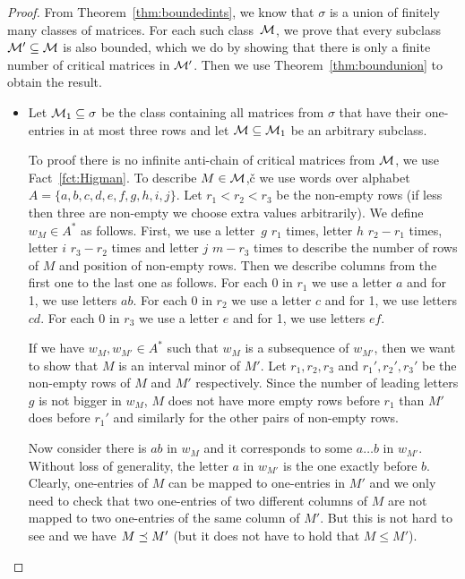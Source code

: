 \begin{proof}
From Theorem~\ref{thm:boundedints}, we know that $\sigma$ is a union of finitely many classes of matrices. For each such class~$\mathcal{M}$, we prove that every subclass $\mathcal{M'}\subseteq\mathcal{M}$ is also bounded, which we do by showing that there is only a finite number of critical matrices in $\mathcal{M'}$. Then we use Theorem~\ref{thm:boundunion} to obtain the result.
\begin{itemize}
	\item Let $\mathcal{M}_1\subseteq\sigma$ be the class containing all matrices from $\sigma$ that have their one-entries in at most three rows and let $\mathcal{M}\subseteq\mathcal{M}_1$ be an arbitrary subclass.
		
		To proof there is no infinite anti-chain of critical matrices from $\mathcal{M}$, we use Fact~\ref{fct:Higman}. To describe $M\in\mathcal{M}$,č we use words over alphabet~$A=\{a,b,c,d,e,f,g,h,i,j\}$. Let $r_1<r_2<r_3$ be the non-empty rows (if less then three are non-empty we choose extra values arbitrarily). We define $w_M\in A^*$ as follows. First, we use a letter~$g$ $r_1$ times, letter $h$ $r_2-r_1$ times, letter $i$ $r_3-r_2$ times and letter $j$ $m-r_3$ times to describe the number of rows of $M$ and position of non-empty rows. Then we describe columns from the first one to the last one as follows. For each 0 in $r_1$ we use a letter $a$ and for 1, we use letters $ab$. For each 0 in $r_2$ we use a letter $c$ and for 1, we use letters $cd$. For each 0 in $r_3$ we use a letter $e$ and for 1, we use letters $ef$.
		
		If we have $w_M,w_{M'}\in A^*$ such that $w_M$ is a subsequence of $w_{M'}$, then we want to show that $M$ is an interval minor of $M'$. Let $r_1,r_2,r_3$ and $r_1',r_2',r_3'$ be the non-empty rows of $M$ and $M'$ respectively. Since the number of leading letters $g$ is not bigger in $w_M$, $M$ does not have more empty rows before $r_1$ than $M'$ does before $r_1'$ and similarly for the other pairs of non-empty rows.

		Now consider there is $ab$ in $w_M$ and it corresponds to some $a\dots b$ in $w_{M'}$. Without loss of generality, the letter $a$ in $w_{M'}$ is the one exactly before $b$. Clearly, one-entries of $M$ can be mapped to one-entries in $M'$ and we only need to check that two one-entries of two different columns of $M$ are not mapped to two one-entries of the same column of $M'$. But this is not hard to see and we have $M\preceq M'$ (but it does not have to hold that $M\leq M'$).


\end{itemize}
\end{proof}
